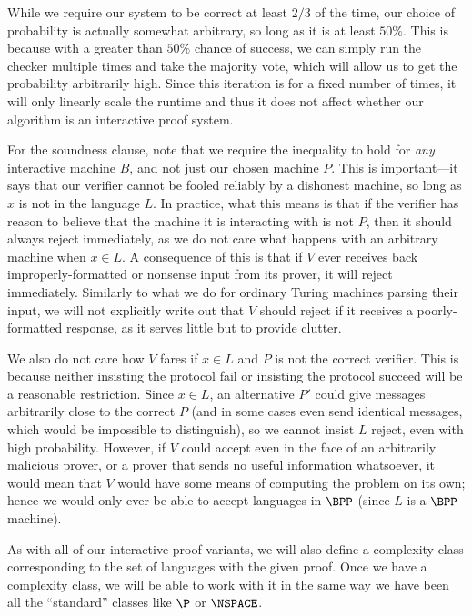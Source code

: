 \documentclass[english,12pt]{reedthesis}
\theoremstyle{plain}
\theoremstyle{definition}
\theoremstyle{remark}
\begin{document}
While we require our system to be correct at least $2/3$ of the time, our choice
of probability is actually somewhat arbitrary, so long as it is at least $50\%$.
This is because with a greater than $50\%$ chance of success, we can simply run
the checker multiple times and take the majority vote, which will allow us to
get the probability arbitrarily high. Since this iteration is for a fixed number
of times, it will only linearly scale the runtime and thus it does not affect
whether our algorithm is an interactive proof system.

For the soundness clause, note that we require the inequality to hold for
\emph{any} interactive machine $B$, and not just our chosen machine $P$. This is
important---it says that our verifier cannot be fooled reliably by a dishonest
machine, so long as $x$ is not in the language $L$. In practice, what this means
is that if the verifier has reason to believe that the machine it is interacting
with is not $P$, then it should always reject immediately, as we do not care
what happens with an arbitrary machine when $x \in L$. A consequence of this is
that if $V$ ever receives back improperly-formatted or nonsense input from its
prover, it will reject immediately. Similarly to what we do for ordinary Turing
machines parsing their input, we will not explicitly write out that $V$ should
reject if it receives a poorly-formatted response, as it serves little but to
provide clutter.

We also do not care how $V$ fares if $x \in L$ and $P$ is not the correct
verifier. This is because neither insisting the protocol fail or insisting the
protocol succeed will be a reasonable restriction. Since $x \in L$, an alternative
$P'$ could give messages arbitrarily close to the correct $P$ (and in some cases
even send identical messages, which would be impossible to distinguish), so we
cannot insist $L$ reject, even with high probability. However, if $V$ could
accept even in the face of an arbitrarily malicious prover, or a prover that
sends no useful information whatsoever, it would mean that $V$ would have some
means of computing the problem on its own; hence we would only ever be able to
accept languages in $\BPP$ (since $L$ is a $\BPP$ machine).

As with all of our interactive-proof variants, we will also define a complexity
class corresponding to the set of languages with the given proof. Once we have a
complexity class, we will be able to work with it in the same way we have been
all the ``standard'' classes like $\P$ or $\NSPACE$.
\end{document}
